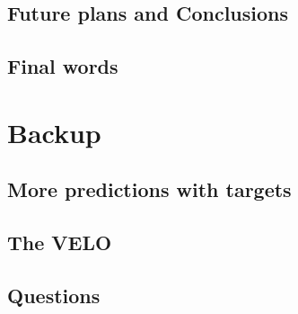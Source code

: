 \documentclass[aspectratio=169, 10pt]{beamer}
\begin{document}
\subsection{Future plans and Conclusions}


\subsection{Final words}




\backupbegin

\section{Backup}

\subsection{More predictions with targets}


\subsection{The VELO}


\subsection{Questions}




\backupend
\end{document}
